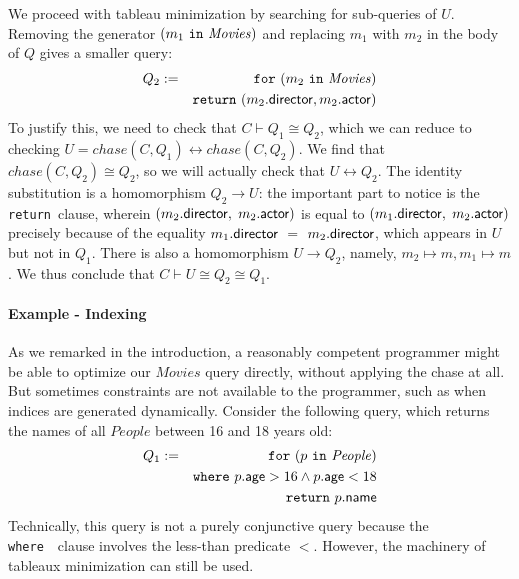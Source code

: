 \documentclass[preprint]{sigplanconf}
\newcommand{\FOR}{{\tt for}\relax\ifmmode\ \else\xspace\fi}
\newcommand{\WHERE}{{\tt where}\relax\ifmmode\ \else\xspace\fi}
\newcommand{\IN}{ \ {\tt in} \ }
\newcommand{\RETURN}{{\tt return}\relax\ifmmode\ \else\xspace\fi}
\newcommand{\relation}[1]{\ensuremath{\mathit{#1}}\xspace}
\begin{document}
We proceed with tableau minimization by searching for sub-queries of $U$.
Removing the generator $(m_1 \IN \relation{Movies})$ and replacing $m_1$ with $m_2$ in the body of $Q$ gives a smaller query:
\begin{eqnarray*}
Q_2 & := & \FOR (m_2 \IN \relation{Movies}) \\
 & & \RETURN (m_2.{\sf director}, m_2.{\sf actor})
\end{eqnarray*}
To justify this, we need to check that $C \vdash Q_1 \cong Q_2$, which we can reduce to checking $U = chase(C,Q_1) \leftrightarrow chase(C, Q_2)$.
We find that $chase(C, Q_2) \cong Q_2$, so we will actually check that  $U \leftrightarrow Q_2$.
The identity substitution is a homomorphism $Q_2 \to U$: the important part to notice is the \RETURN clause, wherein $(m_2.{\sf director},$ $m_2.{\sf actor})$ is equal to $(m_1.{\sf director},$ $m_2.{\sf actor})$ precisely because of the equality $m_1.{\sf director}$ $=$ $m_2.{\sf director}$, which appears in $U$ but not in $Q_1$.
There is also a homomorphism $U \to Q_2$, namely, $m_2 \mapsto m, m_1 \mapsto m$.  We thus conclude that $C \vdash U \cong Q_2 \cong Q_1$. 

\paragraph{Example - Indexing}
As we remarked in the introduction, a reasonably competent programmer might be able to optimize our \relation{Movies} query directly, without applying the chase at all.  But sometimes constraints are not available to the programmer, such as when indices are generated dynamically.  Consider the following query, which returns the names of all \relation{People} between 16 and 18 years old:
\begin{eqnarray*}
Q_1 & := & \FOR (p \IN \relation{People}) \\
 & & \WHERE p.{\sf age} > 16 \wedge p.{\sf age} < 18 \\
 & & \RETURN p.{\sf name}
\end{eqnarray*}
Technically, this query is not a purely conjunctive query because the \WHERE\ clause involves the less-than predicate $<$.
However, the machinery of tableaux minimization can still be used.
\end{document}
